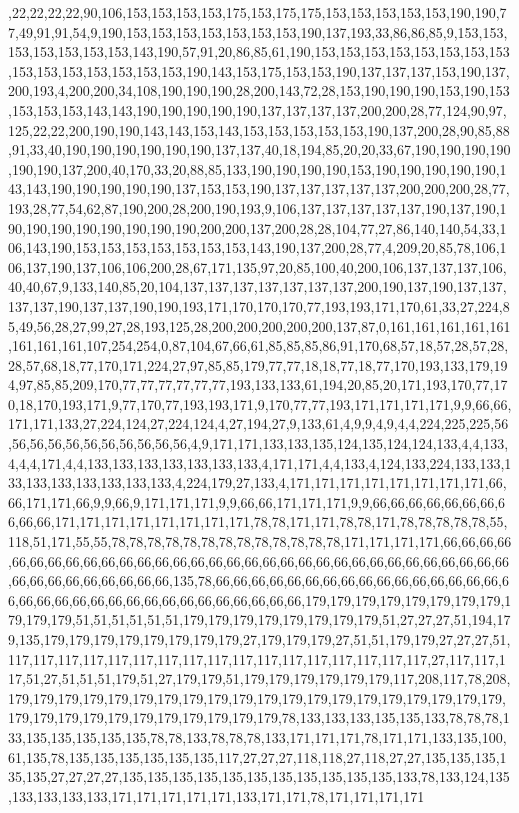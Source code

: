 ,22,22,22,22,90,106,153,153,153,153,175,153,175,175,153,153,153,153,153,190,190,77,49,91,91,54,9,190,153,153,153,153,153,153,153,190,137,193,33,86,86,85,9,153,153,153,153,153,153,153,143,190,57,91,20,86,85,61,190,153,153,153,153,153,153,153,153,153,153,153,153,153,153,153,190,143,153,175,153,153,190,137,137,137,153,190,137,200,193,4,200,200,34,108,190,190,190,28,200,143,72,28,153,190,190,190,153,190,153,153,153,153,143,143,190,190,190,190,190,137,137,137,137,200,200,28,77,124,90,97,125,22,22,200,190,190,143,143,153,143,153,153,153,153,153,190,137,200,28,90,85,88,91,33,40,190,190,190,190,190,190,137,137,40,18,194,85,20,20,33,67,190,190,190,190,190,190,137,200,40,170,33,20,88,85,133,190,190,190,190,153,190,190,190,190,190,143,143,190,190,190,190,190,137,153,153,190,137,137,137,137,137,200,200,200,28,77,193,28,77,54,62,87,190,200,28,200,190,193,9,106,137,137,137,137,137,190,137,190,190,190,190,190,190,190,190,190,200,200,137,200,28,28,104,77,27,86,140,140,54,33,106,143,190,153,153,153,153,153,153,153,143,190,137,200,28,77,4,209,20,85,78,106,106,137,190,137,106,106,200,28,67,171,135,97,20,85,100,40,200,106,137,137,137,106,40,40,67,9,133,140,85,20,104,137,137,137,137,137,137,137,200,190,137,190,137,137,137,137,190,137,137,190,190,193,171,170,170,170,77,193,193,171,170,61,33,27,224,85,49,56,28,27,99,27,28,193,125,28,200,200,200,200,200,137,87,0,161,161,161,161,161,161,161,161,107,254,254,0,87,104,67,66,61,85,85,85,86,91,170,68,57,18,57,28,57,28,28,57,68,18,77,170,171,224,27,97,85,85,179,77,77,18,18,77,18,77,170,193,133,179,194,97,85,85,209,170,77,77,77,77,77,77,193,133,133,61,194,20,85,20,171,193,170,77,170,18,170,193,171,9,77,170,77,193,193,171,9,170,77,77,193,171,171,171,171,9,9,66,66,171,171,133,27,224,124,27,224,124,4,27,194,27,9,133,61,4,9,9,4,9,4,4,224,225,225,56,56,56,56,56,56,56,56,56,56,56,4,9,171,171,133,133,135,124,135,124,124,133,4,4,133,4,4,4,171,4,4,133,133,133,133,133,133,133,4,171,171,4,4,133,4,124,133,224,133,133,133,133,133,133,133,133,133,4,224,179,27,133,4,171,171,171,171,171,171,171,171,66,66,171,171,66,9,9,66,9,171,171,171,9,9,66,66,171,171,171,9,9,66,66,66,66,66,66,66,66,66,66,171,171,171,171,171,171,171,171,78,78,171,171,78,78,171,78,78,78,78,78,55,118,51,171,55,55,78,78,78,78,78,78,78,78,78,78,78,78,78,171,171,171,171,66,66,66,66,66,66,66,66,66,66,66,66,66,66,66,66,66,66,66,66,66,66,66,66,66,66,66,66,66,66,66,66,66,66,66,66,66,66,66,66,66,135,78,66,66,66,66,66,66,66,66,66,66,66,66,66,66,66,66,66,66,66,66,66,66,66,66,66,66,66,66,66,66,66,66,66,179,179,179,179,179,179,179,179,179,179,179,51,51,51,51,51,51,179,179,179,179,179,179,179,179,51,27,27,27,51,194,179,135,179,179,179,179,179,179,179,179,27,179,179,179,27,51,51,179,179,27,27,27,51,117,117,117,117,117,117,117,117,117,117,117,117,117,117,117,117,117,27,117,117,117,51,27,51,51,51,179,51,27,179,179,51,179,179,179,179,179,179,117,208,117,78,208,179,179,179,179,179,179,179,179,179,179,179,179,179,179,179,179,179,179,179,179,179,179,179,179,179,179,179,179,179,179,179,78,133,133,133,135,135,133,78,78,78,133,135,135,135,135,135,78,78,133,78,78,78,133,171,171,171,78,171,171,133,135,100,61,135,78,135,135,135,135,135,135,117,27,27,27,118,118,27,118,27,27,135,135,135,135,135,27,27,27,27,135,135,135,135,135,135,135,135,135,135,135,133,78,133,124,135,133,133,133,133,171,171,171,171,171,133,171,171,78,171,171,171,171